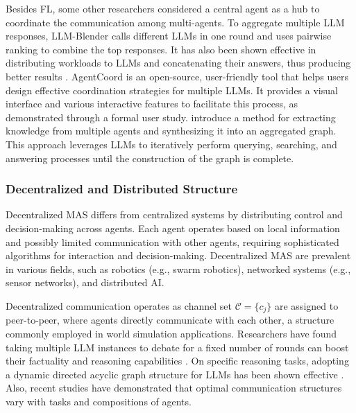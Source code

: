 \documentclass[acmsmall,nonacm]{acmart}
\def\gC{{\mathcal{C}}}
\begin{document}
        Besides FL, some other researchers considered a central agent as a hub to coordinate the communication among multi-agents. To aggregate multiple LLM responses, LLM-Blender \cite{jiang-etal-2023-llm} calls different LLMs in one round and uses pairwise ranking to combine the top responses. It has also been shown effective in distributing workloads to LLMs and concatenating their answers, thus producing better results \cite{ning2024skeletonofthought,suzgun2024metapromptingenhancinglanguagemodels,qiao2024autoactautomaticagentlearning}. AgentCoord \cite{pan2024agentcoordvisuallyexploringcoordination} is an open-source, user-friendly tool that helps users design effective coordination strategies for multiple LLMs. It provides a visual interface and various interactive features to facilitate this process, as demonstrated through a formal user study.
        \cite{zhuge2023mindstormsnaturallanguagebasedsocieties, pmlr-v235-zhuge24a} introduce a method for extracting knowledge from multiple agents and synthesizing it into an aggregated graph. This approach leverages LLMs to iteratively perform querying, searching, and answering processes until the construction of the graph is complete.
       
        \subsubsection{Decentralized and Distributed Structure} 
        Decentralized MAS differs from centralized systems by distributing control and decision-making across agents. Each agent operates based on local information and possibly limited communication with other agents, requiring sophisticated algorithms for interaction and decision-making. Decentralized MAS are prevalent in various fields, such as robotics (e.g., swarm robotics), networked systems (e.g., sensor networks), and distributed AI.
        
        Decentralized communication operates as channel set  $\gC = \{c_j\}$ are assigned to peer-to-peer, where agents directly communicate with each other, a structure commonly employed in world simulation applications. Researchers have found taking multiple LLM instances to debate for a fixed number of rounds can boost their factuality and reasoning capabilities \cite{du2023improvingfactualityreasoninglanguage, liang-etal-2024-encouraging,xiong-etal-2023-examining}.
        On specific reasoning tasks, adopting a dynamic directed acyclic graph structure for LLMs has been shown effective \cite{zhang2024cumulativereasoninglargelanguage}. Also, recent studies \cite{yin-etal-2023-exchange, chen2024agentverse, zhang-etal-2024-exploring} have demonstrated that optimal communication structures vary with tasks and compositions of agents.
        
\end{document}
